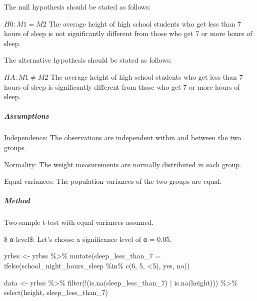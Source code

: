 \documentclass[
]{article}
\newenvironment{Shaded}{\begin{snugshade}}{\end{snugshade}}
\newcommand{\AttributeTok}[1]{\textcolor[rgb]{0.77,0.63,0.00}{#1}}
\newcommand{\FunctionTok}[1]{\textcolor[rgb]{0.00,0.00,0.00}{#1}}
\newcommand{\NormalTok}[1]{#1}
\newcommand{\OtherTok}[1]{\textcolor[rgb]{0.56,0.35,0.01}{#1}}
\newcommand{\SpecialCharTok}[1]{\textcolor[rgb]{0.00,0.00,0.00}{#1}}
\newcommand{\StringTok}[1]{\textcolor[rgb]{0.31,0.60,0.02}{#1}}
\begin{document}
The null hypothesis should be stated as follows:

\(H0: M1 = M2\) The average height of high school students who get less
than 7 hours of sleep is not significantly different from those who get
7 or more hours of sleep.

The alternative hypothesis should be stated as follows:

\(HA: M1 ≠ M2\) The average height of high school students who get less
than 7 hours of sleep is significantly different from those who get 7 or
more hours of sleep.

\hypertarget{assumptions}{%
\subparagraph{Assumptions}\label{assumptions}}

Independence: The observations are independent within and between the
two groups.

Normality: The weight measurements are normally distributed in each
group.

Equal variances: The population variances of the two groups are equal.

\hypertarget{method}{%
\subparagraph{Method}\label{method}}

Two-sample t-test with equal variances assumed.

\$ α level\$: Let's choose a significance level of α = 0.05.

\begin{Shaded}
\begin{Highlighting}[]
\NormalTok{yrbss }\OtherTok{\textless{}{-}}\NormalTok{ yrbss }\SpecialCharTok{\%\textgreater{}\%} 
  \FunctionTok{mutate}\NormalTok{(}\AttributeTok{sleep\_less\_than\_7 =} 
           \FunctionTok{ifelse}\NormalTok{(school\_night\_hours\_sleep }\SpecialCharTok{\%in\%} \FunctionTok{c}\NormalTok{(}\StringTok{\textquotesingle{}6\textquotesingle{}}\NormalTok{, }\StringTok{\textquotesingle{}5\textquotesingle{}}\NormalTok{, }\StringTok{\textquotesingle{}\textless{}5\textquotesingle{}}\NormalTok{), }\StringTok{\textquotesingle{}yes\textquotesingle{}}\NormalTok{, }\StringTok{\textquotesingle{}no\textquotesingle{}}\NormalTok{))}
\end{Highlighting}
\end{Shaded}

\begin{Shaded}
\begin{Highlighting}[]
\NormalTok{data }\OtherTok{\textless{}{-}}\NormalTok{ yrbss }\SpecialCharTok{\%\textgreater{}\%} 
  \FunctionTok{filter}\NormalTok{(}\SpecialCharTok{!}\NormalTok{(}\FunctionTok{is.na}\NormalTok{(sleep\_less\_than\_7) }\SpecialCharTok{|} \FunctionTok{is.na}\NormalTok{(height))) }\SpecialCharTok{\%\textgreater{}\%}
  \FunctionTok{select}\NormalTok{(height, sleep\_less\_than\_7)}
\end{Highlighting}
\end{Shaded}
\end{document}
